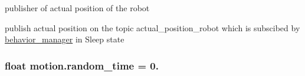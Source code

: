 publisher of actual position of the robot 

publish actual position on the topic actual\+\_\+position\+\_\+robot which is subscibed by \hyperlink{namespacebehavior__manager}{behavior\+\_\+manager} in Sleep state 
\subsubsection[{\texorpdfstring{random\+\_\+time}{random_time}}]{\setlength{\rightskip}{0pt plus 5cm}float motion.\+random\+\_\+time = 0.}\hypertarget{namespacemotion_a577a5f71c1bdf849f48eed17c4134bee}{}\label{namespacemotion_a577a5f71c1bdf849f48eed17c4134bee}
